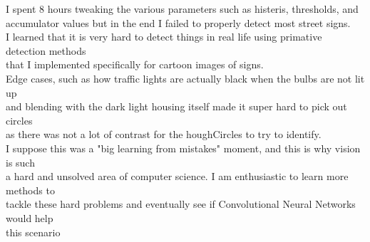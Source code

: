 I spent 8 hours tweaking the various parameters such as histeris, thresholds, and accumulator values but in the end I failed to properly detect most street signs.\\
I learned that it is very hard to detect things in real life using primative detection methods\\
that I implemented specifically for cartoon images of signs.\\
Edge cases, such as how traffic lights are actually black when the bulbs are not lit up \\
and blending with the dark light housing itself made it super hard to pick out circles \\
as there was not a lot of contrast for the houghCircles to try to identify.\\
I suppose this was a "big learning from mistakes" moment, and this is why vision is such\\
a hard and unsolved area of computer science.  I am enthusiastic to learn more methods to\\
tackle these hard problems and eventually see if Convolutional Neural Networks would help \\
this scenario\\

